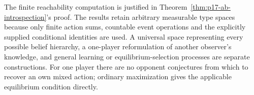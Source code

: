 The finite reachability computation is justified in
Theorem~\ref{thm:p17-ab-introspection}'s proof. The results retain
arbitrary measurable type spaces because only finite action sums,
countable event operations and the explicitly supplied conditional
identities are used. A universal space representing every possible
belief hierarchy, a one-player reformulation of another observer's
knowledge, and general learning or equilibrium-selection processes are
separate constructions. For one player there are no opponent
conjectures from which to recover an own mixed action; ordinary
maximization gives the applicable equilibrium condition directly.

